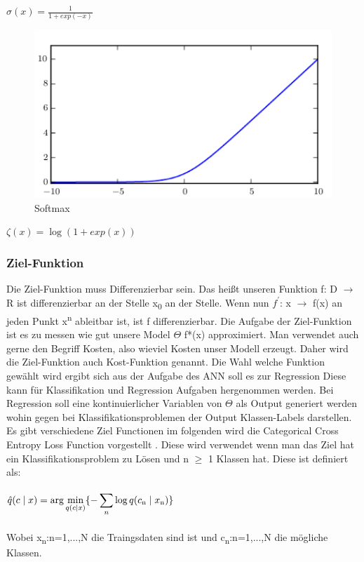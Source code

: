 \documentclass{llncs}
\begin{document}
\begin{math}
\sigma(x)=\frac{1}{1+exp(-x)}
\end{math}

\begin{figure}[htbp] 
	\centering
	\includegraphics[width=1.0\textwidth]{softmax.png}
	\caption{Softmax}
	\label{fig:Bild1}
\end{figure}

\begin{math}
\zeta(x) = \log(1+exp(x))
\end{math}
\subsubsection{Ziel-Funktion}

Die Ziel-Funktion muss Differenzierbar sein. Das heißt unseren Funktion f: D $\to$ R ist differenzierbar an der Stelle x\textsubscript{0} an der Stelle. Wenn nun $f^\prime$: x $\to$ f(x) an jeden Punkt x\textsuperscript{n} ableitbar ist, ist f differenzierbar. Die Aufgabe der Ziel-Funktion ist es zu messen wie gut unsere Model $\Theta$ f*(x) approximiert. Man verwendet auch gerne den Begriff Kosten, also wieviel Kosten unser Modell erzeugt. Daher wird die Ziel-Funktion auch Kost-Funktion genannt. Die Wahl welche Funktion gewählt wird ergibt sich aus der Aufgabe des ANN soll es zur Regression Diese kann für Klassifikation und Regression Aufgaben hergenommen werden.   Bei Regression soll eine kontinuierlicher Variablen von $\Theta$ als Output generiert werden wohin gegen bei Klassifikationsproblemen der Output Klassen-Labels darstellen. Es gibt verschiedene Ziel Functionen im folgenden wird die Categorical Cross Entropy Loss Function vorgestellt \cite{crossentropy}. Diese wird verwendet wenn man das Ziel hat ein Klassifikationsproblem zu Lösen und n $\geq$ 1 Klassen hat. Diese ist definiert als:
\\\\
\begin{math}
\hat{q}(c\mid x)=\displaystyle\arg\min_{q(c\mid  x)}\{-\displaystyle\sum_{n}{\log q(c\textsubscript{n}\mid x\textsubscript{n})}\}
\end{math}
\\\\
Wobei  x\textsubscript{n}:n=1,...,N die Traingsdaten sind ist und c\textsubscript{n}:n=1,...,N die mögliche Klassen.
\newpage
\end{document}
